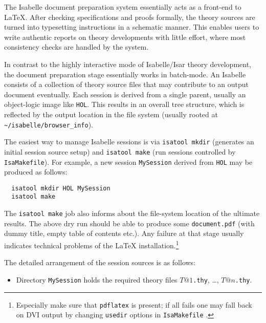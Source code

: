 \begin{isabellebody}
\begin{isamarkuptext}
  \medskip The Isabelle document preparation system essentially acts
  as a front-end to {\LaTeX}.  After checking specifications and
  proofs formally, the theory sources are turned into typesetting
  instructions in a schematic manner.  This enables users to write
  authentic reports on theory developments with little effort, where
  most consistency checks are handled by the system.%
\end{isamarkuptext}%
\isamarkuptrue%
%
\isamarkuptrue%
%
\begin{isamarkuptext}%
In contrast to the highly interactive mode of Isabelle/Isar theory
  development, the document preparation stage essentially works in
  batch-mode.  An Isabelle  consists of a collection
  of theory source files that may contribute to an output document
  eventually.  Each session is derived from a single parent, usually
  an object-logic image like \texttt{HOL}.  This results in an overall
  tree structure, which is reflected by the output location in the
  file system (usually rooted at \verb,~/isabelle/browser_info,).

  \medskip The easiest way to manage Isabelle sessions is via
  \texttt{isatool mkdir} (generates an initial session source setup)
  and \texttt{isatool make} (run sessions controlled by
  \texttt{IsaMakefile}).  For example, a new session
  \texttt{MySession} derived from \texttt{HOL} may be produced as
  follows:

\begin{verbatim}
  isatool mkdir HOL MySession
  isatool make
\end{verbatim}

  The \texttt{isatool make} job also informs about the file-system
  location of the ultimate results.  The above dry run should be able
  to produce some \texttt{document.pdf} (with dummy title, empty table
  of contents etc.).  Any failure at that stage usually indicates
  technical problems of the {\LaTeX} installation.\footnote{Especially
  make sure that \texttt{pdflatex} is present; if all fails one may
  fall back on DVI output by changing \texttt{usedir} options in
  \texttt{IsaMakefile} \cite{isabelle-sys}.}

  \medskip The detailed arrangement of the session sources is as
  follows:

  \begin{itemize}

  \item Directory \texttt{MySession} holds the required theory files
  $T@1$\texttt{.thy}, \dots, $T@n$\texttt{.thy}.


\end{itemize}
\end{isamarkuptext}
\end{isabellebody}
